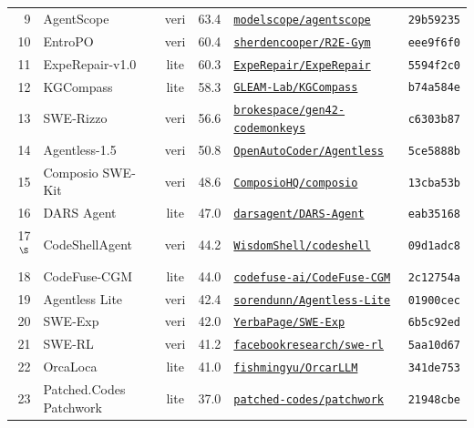 \begin{table}[H]
\begin{tabular}{rlcrlc}
9 & AgentScope & veri & 63.4 & \href{https://github.com/modelscope/agentscope}{\texttt{modelscope/agentscope}} & \texttt{29b59235} \\
10 & EntroPO & veri & 60.4 & \href{https://github.com/sherdencooper/R2E-Gym}{\texttt{sherdencooper/R2E-Gym}} & \texttt{eee9f6f0} \\
11 & ExpeRepair-v1.0 & lite & 60.3 & \href{https://github.com/ExpeRepair/ExpeRepair}{\texttt{ExpeRepair/ExpeRepair}} & \texttt{5594f2c0} \\
12 & KGCompass & lite & 58.3 & \href{https://github.com/GLEAM-Lab/KGCompass}{\texttt{GLEAM-Lab/KGCompass}} & \texttt{b74a584e} \\
13 & SWE-Rizzo & veri & 56.6 & \href{https://github.com/brokespace/gen42-codemonkeys}{\texttt{brokespace/gen42-codemonkeys}} & \texttt{c6303b87} \\
14 & Agentless-1.5 & veri & 50.8 & \href{https://github.com/OpenAutoCoder/Agentless}{\texttt{OpenAutoCoder/Agentless}} & \texttt{5ce5888b} \\
15 & Composio SWE-Kit & veri & 48.6 & \href{https://github.com/ComposioHQ/composio}{\texttt{ComposioHQ/composio}} & \texttt{13cba53b} \\
16 & DARS Agent & lite & 47.0 & \href{https://github.com/darsagent/DARS-Agent}{\texttt{darsagent/DARS-Agent}} & \texttt{eab35168} \\
17$^{\S}$ & CodeShellAgent & veri & 44.2 & \href{https://github.com/WisdomShell/codeshell}{\texttt{WisdomShell/codeshell}} & \texttt{09d1adc8} \\
18 & CodeFuse-CGM & lite & 44.0 & \href{https://github.com/codefuse-ai/CodeFuse-CGM}{\texttt{codefuse-ai/CodeFuse-CGM}} & \texttt{2c12754a} \\
19 & Agentless Lite & veri & 42.4 & \href{https://github.com/sorendunn/Agentless-Lite}{\texttt{sorendunn/Agentless-Lite}} & \texttt{01900cec} \\
20 & SWE-Exp & veri & 42.0 & \href{https://github.com/YerbaPage/SWE-Exp}{\texttt{YerbaPage/SWE-Exp}} & \texttt{6b5c92ed} \\
21 & SWE-RL & veri & 41.2 & \href{https://github.com/facebookresearch/swe-rl}{\texttt{facebookresearch/swe-rl}} & \texttt{5aa10d67} \\
22 & OrcaLoca & lite & 41.0 & \href{https://github.com/fishmingyu/OrcarLLM}{\texttt{fishmingyu/OrcarLLM}} & \texttt{341de753} \\
23 & Patched.Codes Patchwork & lite & 37.0 & \href{https://github.com/patched-codes/patchwork}{\texttt{patched-codes/patchwork}} & \texttt{21948cbe} \\

\end{tabular}
\end{table}
